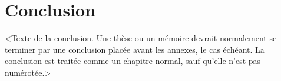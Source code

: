 \chapter*{Conclusion}           %
\label{chap:conclusion}         %

<Texte de la conclusion. Une thèse ou un mémoire devrait normalement
se terminer par une conclusion placée avant les annexes, le cas
échéant. La conclusion est traitée comme un chapitre normal, sauf
qu'elle n'est pas numérotée.>
